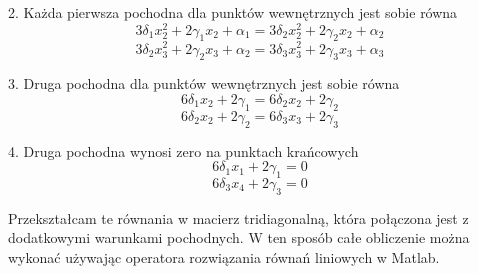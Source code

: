 \documentclass[varwidth,12pt,a4paper]{article}
\begin{document}
2. Każda pierwsza pochodna dla punktów wewnętrznych jest sobie równa
\begin{equation}
    3 \delta _1 x_2 ^2 + 2 \gamma _1 x_2 + \alpha _1 = 3 \delta _2 x_2 ^2 + 2 \gamma _2 x_2 + \alpha _2
\end{equation}
\begin{equation}
    3 \delta _2 x_3 ^2 + 2 \gamma _2 x_3 + \alpha _2 = 3 \delta _3 x_3 ^2 + 2 \gamma _3 x_3 + \alpha _3
\end{equation}

3. Druga pochodna dla punktów wewnętrznych jest sobie równa
\begin{equation}
    6\delta _1 x_2 + 2 \gamma _1 = 6 \delta _2 x_2 + 2 \gamma _2
\end{equation}
\begin{equation}
    6\delta _2 x_2 + 2 \gamma _2 = 6 \delta _3 x_3 + 2 \gamma _3
\end{equation}

4. Druga pochodna wynosi zero na punktach krańcowych
\begin{equation}
    6\delta _1 x_1 + 2 \gamma _1 = 0
\end{equation}
\begin{equation}
    6\delta _3 x_4 + 2 \gamma _3 = 0
\end{equation}

Przekształcam te równania w macierz tridiagonalną, która połączona jest z dodatkowymi warunkami pochodnych. 
W ten sposób całe obliczenie można wykonać używając operatora rozwiązania równań liniowych w Matlab.
\end{document}
